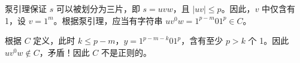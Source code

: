 \documentclass[11pt,addpoints,answers]{exam}
\begin{document}
\begin{questions}
\begin{parts}
\begin{solution}
泵引理保证 \( s \) 可以被划分为三片，即 \( s = uvw \)，且 \( |uv| \leq p \)。因此，\( v \) 中仅含有 1，设 \( v = 1^m \)。根据泵引理，应当有字符串 \( uv^0w = 1^{p-m}01^p \in C \)。

根据 \( C \) 定义，此时 \( k \leq p - m \)，\( y = 1^{p-m-k}01^p \)，含有至少 \( p > k \) 个 1。因此 \( uv^0w \notin C \)，矛盾！因此 \( C \) 不是正则的。
	    \end{solution} 
  \end{parts}

\end{questions}
\end{document}
